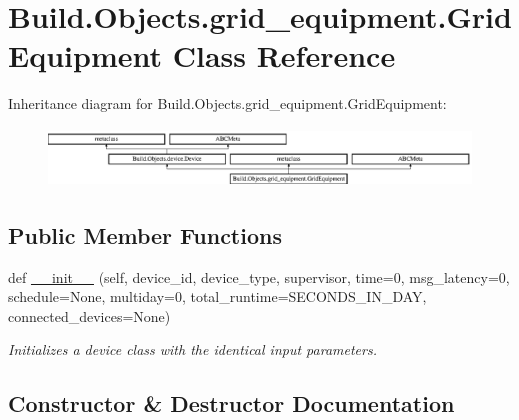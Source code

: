 \hypertarget{class_build_1_1_objects_1_1grid__equipment_1_1_grid_equipment}{}\section{Build.\+Objects.\+grid\+\_\+equipment.\+Grid\+Equipment Class Reference}
\label{class_build_1_1_objects_1_1grid__equipment_1_1_grid_equipment}
Inheritance diagram for Build.\+Objects.\+grid\+\_\+equipment.\+Grid\+Equipment\+:\begin{figure}[H]
\begin{center}
\leavevmode
\includegraphics[height=1.561338cm]{class_build_1_1_objects_1_1grid__equipment_1_1_grid_equipment}
\end{center}
\end{figure}
\subsection*{Public Member Functions}
\begin{DoxyCompactItemize}
\item 
def \hyperlink{class_build_1_1_objects_1_1grid__equipment_1_1_grid_equipment_ad25af93202f0bb0c326516f4725b92a8}{\+\_\+\+\_\+init\+\_\+\+\_\+} (self, device\+\_\+id, device\+\_\+type, supervisor, time=0, msg\+\_\+latency=0, schedule=None, multiday=0, total\+\_\+runtime=S\+E\+C\+O\+N\+D\+S\+\_\+\+I\+N\+\_\+\+D\+AY, connected\+\_\+devices=None)
\begin{DoxyCompactList}\small\item\em Initializes a device class with the identical input parameters. \end{DoxyCompactList}\end{DoxyCompactItemize}


\subsection{Constructor \& Destructor Documentation}
\mbox{\label{class_build_1_1_objects_1_1grid__equipment_1_1_grid_equipment_ad25af93202f0bb0c326516f4725b92a8}} 
